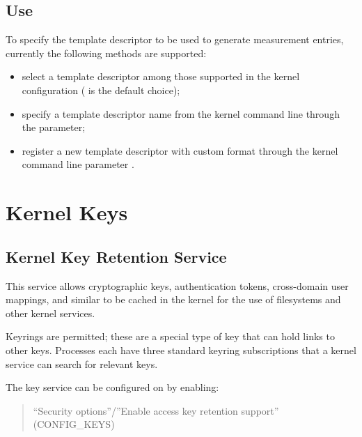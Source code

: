 \documentclass[a4paper,8pt,english]{sphinxmanual}
\begin{document}
\section{Use}
\label{security/IMA-templates:use}
To specify the template descriptor to be used to generate measurement entries,
currently the following methods are supported:
\begin{itemize}
\item {} 
select a template descriptor among those supported in the kernel
configuration ( is the default choice);

\item {} 
specify a template descriptor name from the kernel command line through
the  parameter;

\item {} 
register a new template descriptor with custom format through the kernel
command line parameter .

\end{itemize}


\chapter{Kernel Keys}
\label{security/keys/index::doc}\label{security/keys/index:kernel-keys}

\section{Kernel Key Retention Service}
\label{security/keys/core::doc}\label{security/keys/core:kernel-key-retention-service}
This service allows cryptographic keys, authentication tokens, cross-domain
user mappings, and similar to be cached in the kernel for the use of
filesystems and other kernel services.

Keyrings are permitted; these are a special type of key that can hold links to
other keys. Processes each have three standard keyring subscriptions that a
kernel service can search for relevant keys.

The key service can be configured on by enabling:
\begin{quote}

``Security options''/''Enable access key retention support'' (CONFIG\_KEYS)
\end{quote}
\end{document}
